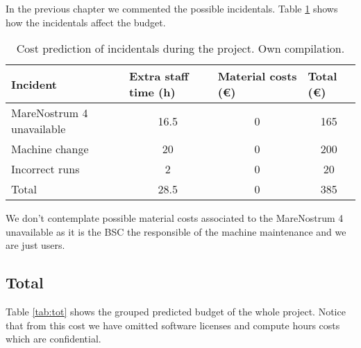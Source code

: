 \justify
In the previous chapter we commented the possible incidentals. Table \ref{tab:inc} shows how the incidentals affect the budget.
\begin{table}[htbp!]
\centering
\begin{tabular}{|l|c|c|c|}
\hline
Incident                  & \multicolumn{1}{l|}{Extra staff time (h)} & \multicolumn{1}{l|}{Material costs (\euro)} & \multicolumn{1}{l|}{Total (\euro)} \\ \hline
MareNostrum 4 unavailable & 16.5                                      & 0                                                 & 165                                \\ \hline
Machine change            & 20                                        & 0                                                 & 200                                \\ \hline
Incorrect runs            & 2                                         & 0                                                 & 20                                 \\ \hline
Total                     & 28.5                                      & 0                                                 & 385                                \\ \hline
\end{tabular}
\caption[Cost prediction of incidentals during the project]{Cost prediction of incidentals during the project. Own compilation.}
\label{tab:inc}
\end{table}

\justify
We don't contemplate possible material costs associated to the MareNostrum 4 unavailable as it is the BSC the responsible of the machine maintenance and we are just users. 

\subsection{Total}

\justify
Table \ref{tab:tot} shows the grouped predicted budget of the whole project. Notice that from this cost we have omitted software licenses and compute hours costs which are confidential.

